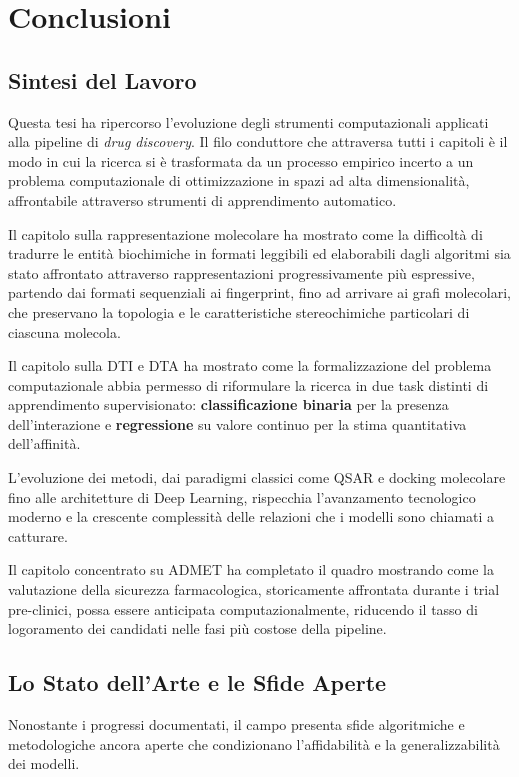 \chapter{Conclusioni}

\section{Sintesi del Lavoro}
Questa tesi ha ripercorso l'evoluzione degli strumenti 
computazionali applicati alla pipeline di \textit{drug discovery}.
Il filo conduttore 
che attraversa tutti i capitoli è il modo in cui la ricerca si è trasformata da un 
processo empirico incerto a un 
problema computazionale di ottimizzazione in spazi ad alta dimensionalità, 
affrontabile attraverso strumenti di apprendimento automatico.

Il capitolo sulla rappresentazione molecolare ha mostrato come 
la difficoltà di tradurre le entità biochimiche in formati leggibili ed elaborabili dagli algoritmi sia stato 
affrontato attraverso rappresentazioni progressivamente più 
espressive, partendo dai formati sequenziali ai fingerprint,
fino ad arrivare ai grafi molecolari, che preservano la topologia e le caratteristiche
stereochimiche particolari di ciascuna molecola. 

Il capitolo sulla DTI e DTA ha mostrato come la formalizzazione 
del problema computazionale abbia 
permesso di riformulare la ricerca in due task 
distinti di apprendimento supervisionato: \textbf{classificazione binaria} per la presenza dell'interazione e \textbf{regressione} su valore continuo per 
la stima quantitativa dell'affinità. 

L'evoluzione dei metodi, dai paradigmi classici come QSAR e docking molecolare fino alle architetture di Deep Learning, rispecchia l'avanzamento tecnologico moderno e la crescente
complessità delle relazioni che i modelli sono chiamati a 
catturare.

Il capitolo concentrato su ADMET ha completato il quadro mostrando come la 
valutazione della sicurezza farmacologica, storicamente 
affrontata durante i trial pre-clinici, possa essere anticipata 
computazionalmente, riducendo il tasso di logoramento dei 
candidati nelle fasi più costose della pipeline.

\section{Lo Stato dell'Arte e le Sfide Aperte}
Nonostante i progressi documentati, il campo presenta sfide 
algoritmiche e metodologiche ancora aperte che condizionano 
l'affidabilità e la generalizzabilità dei modelli.

